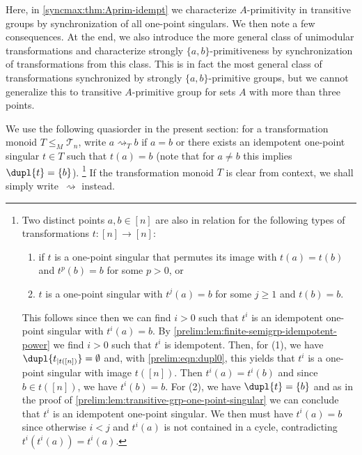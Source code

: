 
Here, in \cref{syncmax:thm:Aprim-idempt} we characterize $A$-primitivity in transitive groups 
by synchronization of all one-point singulars.
We then note a few consequences. At the end, we also introduce the more general class
of unimodular transformations and characterize strongly $\{a,b\}$-primitiveness
by synchronization of transformations from this class. This is in fact the most general class
of transformations synchronized by strongly $\{a,b\}$-primitive groups, but 
we cannot generalize this to transitive $A$-primitive group for sets $A$ with more than three points.

\label{def:quasiorderidemp}
We use the following quasiorder in the present section:
for a transformation monoid  $T \le_M \mathcal T_n$,
write $a \rightsquigarrow_T b$ 
if $a = b$ or there exists an idempotent one-point singular $t \in T$
such that $t(a) = b$ (note that for $a\ne b$ this implies $\dupl{t} = \{b\}$).
\footnote{Two distinct points $a,b \in [n]$ are also in relation for the following types of 
	transformations $t \colon [n] \to [n]$:
	\begin{enumerate}
		\item if $t$ is a one-point singular that permutes its image with $t(a) = t(b)$ and $t^p(b) = b$ for some $p > 0$, or
		
		\item $t$ is a one-point singular with $t^j(a) = b$ for some $j \ge 1$ and $t(b) = b$.
	\end{enumerate}	
	This follows since then we can find  $i > 0$ such that $t^i$ is an idempotent one-point singular
	with $t^i(a) = b$.
	By \cref{prelim:lem:finite-semigrp-idempotent-power}
	we find $i > 0$ such that $t^i$ is idempotent.
	Then, for (1), we have $\dupl{t_{|t([n])}} = \emptyset$
	and, with \cref{prelim:eqn:dupl0}, this yields that $t^i$ is a one-point singular
	with image $t([n])$. Then $t^i(a) = t^i(b)$
	and since $b \in t([n])$,
	we have $t^i(b) = b$.
	For (2), we have $\dupl{t} = \{b\}$ and as in the proof of \cref{prelim:lem:transitive-grp-one-point-singular} 
	we can conclude that $t^i$ is an idempotent one-point singular.
	We then must have $t^i(a) = b$
	since otherwise $i < j$ and $t^i(a)$ is not contained in a cycle, contradicting
	$t^i(t^i(a)) = t^i(a)$.
}
If the transformation
monoid $T$ is clear from context, we shall simply write~$\rightsquigarrow$ instead.

